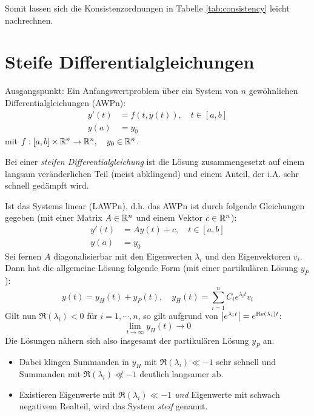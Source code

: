 					Somit lassen sich die Konsistenzordnungen in Tabelle \ref{tab:consistency} leicht nachrechnen.

		\section{Steife Differentialgleichungen}
			Ausgangspunkt: Ein Anfangswertproblem über ein System von \(n\) gewöhnlichen Differentialgleichungen (AWPn):
			\begin{align*}
				y'(t) & = f(t, y(t)), \quad t \in [a, b] \\
				y(a)  & = y_0
			\end{align*}
			mit \( f : [a, b] \times \mathbb{R}^n \rightarrow \mathbb{R}^n, \quad y_0 \in \mathbb{R}^n \).

			Bei einer \textit{steifen Differentialgleichung} ist die Lösung zusammengesetzt auf einem langsam veränderlichen Teil (meist abklingend) und einem Anteil, der i.A. sehr schnell gedämpft wird.

			Ist das Systems linear (LAWPn), d.h. das AWPn ist durch folgende Gleichungen gegeben (mit einer Matrix \( A \in \mathbb{R}^n \) und einem Vektor \( c \in \mathbb{R}^n \)):
			\begin{align*}
				y'(t) & = Ay(t) + c, \quad t \in [a, b] \\
				y(a)  & = y_0
			\end{align*}
			Sei fernen \(A\) diagonalisierbar mit den Eigenwerten \(\lambda_i\) und den Eigenvektoren \(v_i\). Dann hat die allgemeine Lösung folgende Form (mit einer partikulären Lösung \(y_P\)):
			\begin{equation*}
				y(t) = y_H(t) + y_P(t), \quad y_H(t) = \sum_{i=1}^{n} C_i e^{\lambda_i t} v_i
			\end{equation*}
			Gilt nun \( \Re(\lambda_i) < 0 \) für \( i = 1, \cdots, n \), so gilt aufgrund von \( \abs{e^{\lambda_i t}} = e^{\Re(\lambda_i)t} \):
			\begin{equation*}
				\lim\limits_{t \rightarrow \infty} y_H(t) \rightarrow 0
			\end{equation*}
			Die Lösungen nähern sich also insgesamt der partikulären Lösung \( y_P \) an.
			\begin{itemize}
				\item Dabei klingen Summanden in \(y_H\) mit \( \Re(\lambda_i) \ll -1 \) sehr schnell und Summanden mit \( \Re(\lambda_i) \not\ll -1 \) deutlich langsamer ab.
				\item Existieren Eigenwerte mit \( \Re(\lambda_i) \ll -1 \) \textit{und} Eigenwerte mit schwach negativem Realteil, wird das System \textit{steif} genannt.
			\end{itemize}

